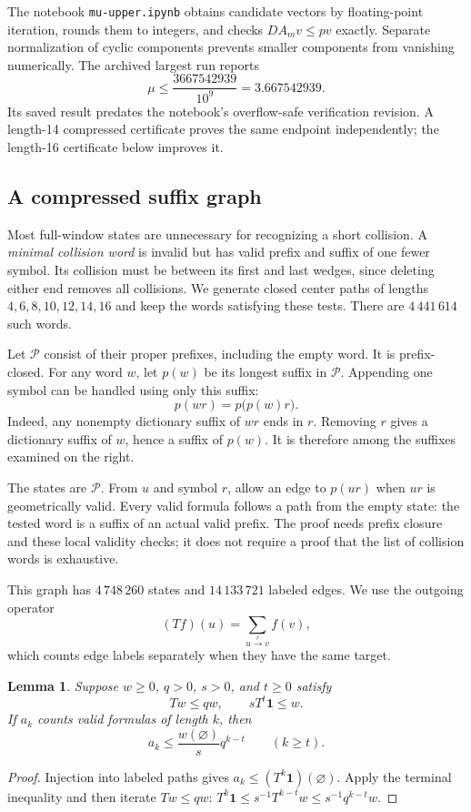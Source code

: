 \documentclass[conference]{IEEEtran}
\newtheorem{lemma}[theorem]{Lemma}
\newcommand{\one}{\mathbf{1}}
\begin{document}
The notebook \texttt{mu-upper.ipynb} obtains candidate vectors by
floating-point iteration, rounds them to integers, and checks
$DA_mv\leq pv$ exactly. Separate normalization of cyclic components
prevents smaller components from vanishing numerically.
The archived largest run reports
\begin{equation}\label{eq:qplus}
 \mu\leq\frac{3667542939}{10^9}=3.667542939.
\end{equation}
Its saved result predates the notebook's overflow-safe verification
revision. A length-14 compressed certificate proves the same endpoint
independently; the length-16 certificate below improves it.

\subsection{A compressed suffix graph}\label{sec:prefix}

Most full-window states are unnecessary for recognizing a short
collision. A \emph{minimal collision word} is invalid but has valid
prefix and suffix of one fewer symbol. Its collision must be
between its first and last wedges, since deleting either end removes
all collisions. We generate closed center paths of lengths
$4,6,8,10,12,14,16$ and keep the words satisfying these tests.
There are $4\,441\,614$ such words.

Let $\mathcal P$ consist of their proper prefixes, including the
empty word. It is prefix-closed. For any word $w$, let $p(w)$
be its longest suffix in $\mathcal P$.
Appending one symbol can be handled using only this suffix:
\[
 p(wr)=p\bigl(p(w)r\bigr).
\]
Indeed, any nonempty dictionary suffix of $wr$ ends in $r$.
Removing $r$ gives a dictionary suffix of $w$, hence a suffix
of $p(w)$. It is therefore among the suffixes examined on the right.

The states are $\mathcal P$. From $u$ and symbol $r$, allow an
edge to $p(ur)$ when $ur$ is geometrically valid.
Every valid formula follows a path from the empty state:
the tested word is a suffix of an actual valid prefix.
The proof needs prefix closure and these local validity checks;
it does not require a proof that the list of collision words is
exhaustive.

This graph has $4\,748\,260$ states and $14\,133\,721$ labeled edges.
We use the outgoing operator
\[
 (Tf)(u)=\sum_{u\xrightarrow{r}v}f(v),
\]
which counts edge labels separately when they have the same target.

\begin{lemma}\label{lem:terminal-potential}
Suppose $w\geq0$, $q>0$, $s>0$, and $t\geq0$ satisfy
\[
 Tw\leq qw,\qquad sT^t\one\leq w.
\]
If $a_k$ counts valid formulas of length $k$, then
\[
 a_k\leq\frac{w(\varnothing)}s q^{k-t}\qquad(k\geq t).
\]
\end{lemma}
\begin{proof}
Injection into labeled paths gives
$a_k\leq(T^k\one)(\varnothing)$.
Apply the terminal inequality and then iterate $Tw\leq qw$:
$T^k\one\leq s^{-1}T^{k-t}w\leq s^{-1}q^{k-t}w$.
\end{proof}
\end{document}
